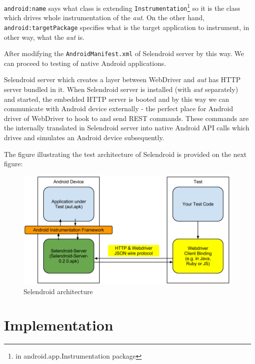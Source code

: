\documentclass[12pt,final,oneside]{fithesis}
\begin{document}


\texttt{android:name} says what class is extending \texttt{Instrumentation}\footnote{in android.app.Instrumentation package} so it is the class which drives whole instrumentation of the \textit{aut}. On the other hand, \texttt{android:targetPackage} specifies what is the target application to instrument, in other way, what the \textit{aut} is.

After modifying the \texttt{AndroidManifest.xml} of Selendroid server by this way. We can proceed to testing of native Android applications.

Selendroid server which creates a layer between WebDriver and \textit{aut} has HTTP server bundled in it. When Selendroid server is installed (with \textit{aut} separately) and started, the embedded HTTP server is booted and by this way we can communicate with Android device externally - the perfect place for Android driver of WebDriver to hook to and send REST commands. These commands are the internally translated in Selendroid server into native Android API calls which drives and simulates an Android device subsequently.

The figure illustrating the test architecture of Selendroid is provided on the next figure:

\begin{figure}[!ht]
	\centering
	\includegraphics[origin=c,width=130mm]{resources/selendroid.png}
	\caption{Selendroid architecture\cite{bib141}}
	\label{fig:selendroid_architecture}
\end{figure}

	\section{Implementation}
\end{document}
